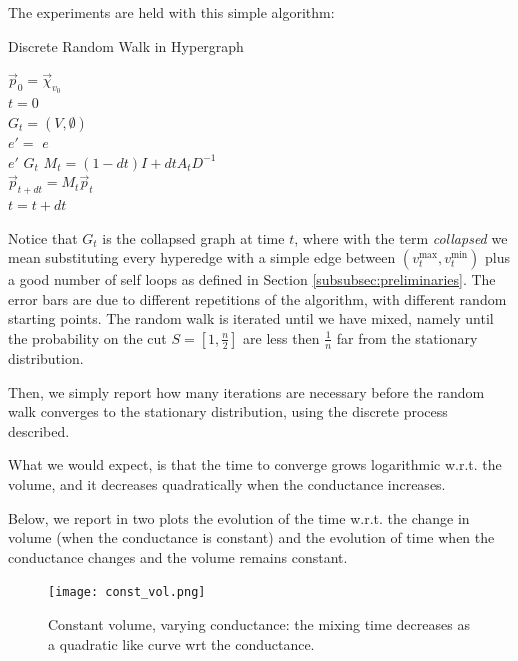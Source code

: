 \documentclass[../main.tex]{subfiles}
\begin{document}
        The experiments are held with this simple algorithm:
        
        \begin{algorithm}
        \caption{Discrete Random Walk in Hypergraph}
        $\vec{p}_0 = \vec{\chi}_{v_0}$ \\
        $t = 0$ \\
         {
            $G_t = (V, \emptyset)$ \\ 
            {
                $e' =$ $e$ \\
                 $e'$  $G_t$
            }
            $M_t = (1-dt) I + dt A_t D^{-1}$ \\
            $\vec{p}_{t+dt} = M_t \vec{p}_t$ \\
            $t = t + dt$
        }
        \end{algorithm}
        
        Notice that $G_t$ is the collapsed graph at time $t$, where with the term \textit{collapsed} we mean substituting every hyperedge with a simple edge between $(v_t^{\text{max}}, v_t^{\text{min}})$ plus a good number of self loops as defined in Section \ref{subsubsec:preliminaries}. The error bars are due to different repetitions of the algorithm, with different random starting points. The random walk is iterated until we have mixed, namely until the probability on the cut $S=[1, \frac{n}{2}]$ are less then $\frac{1}{n}$ far from the stationary distribution.
        
        Then, we simply report how many iterations are necessary before the random walk converges to the stationary distribution, using the discrete process described. 
        
        What we would expect, is that the time to converge grows logarithmic w.r.t. the volume, and it decreases quadratically when the conductance increases.
        
        Below, we report in two plots the evolution of the time w.r.t. the change in volume (when the conductance is constant) and the evolution of time when the conductance changes and the volume remains constant.
    
        \begin{figure}[h]
            \centering
            \texttt{[image: const\_vol.png]}
            \caption{Constant volume, varying conductance: the mixing time decreases as a quadratic like curve wrt the conductance.}
            \label{fig:const_volume}
        \end{figure}
        
\end{document}
